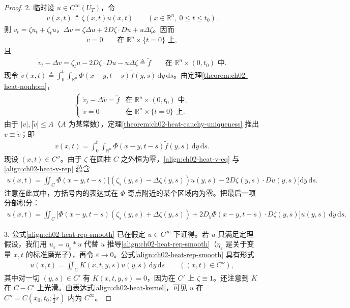 \documentclass[../../main.tex]{subfiles}
\begin{document}
\begin{proof}
2. 临时设 $u\in C^\infty(U_T)$，令
\begin{align*}
v(x,t)\triangleq\zeta(x,t)u(x,t) \qquad (x\in\mathbb{R}^n,\ 0\leqslant t\leqslant t_0).
\end{align*}
则 $v_t=\zeta u_t+\zeta_t u$，$\Delta v=\zeta\Delta u+2D\zeta\cdot Du+u\Delta\zeta$。因而
\begin{align}\label{align:ch02-heat-v0-bis}
v=0 \qquad \text{在 }\mathbb{R}^n\times\{t=0\}\text{ 上},
\end{align}
且
\begin{align}\label{align:ch02-heat-v-eq}
v_t-\Delta v=\zeta_t u-2D\zeta\cdot Du-u\Delta\zeta\triangleq\widetilde{f} \qquad \text{在 }\mathbb{R}^n\times(0,t_0)\text{ 中}.
\end{align}
现令 $\widetilde{v}(x,t)\triangleq\int_0^t\int_{\mathbb{R}^n}\Phi(x-y,t-s)\widetilde{f}(y,s)\,\mathrm{d}y\,\mathrm{d}s$。由定理\cref{theorem:ch02-heat-nonhom}，
\begin{align}\label{align:ch02-heat-vtilde}
\begin{cases}
\widetilde{v}_t-\Delta\widetilde{v}=\widetilde{f} & \text{在 }\mathbb{R}^n\times(0,t_0)\text{ 中},\\
\widetilde{v}=0 & \text{在 }\mathbb{R}^n\times\{t=0\}\text{ 上}.
\end{cases}
\end{align}
由于 $|v|,|\widetilde{v}|\leqslant A$（$A$ 为某常数），定理\cref{theorem:ch02-heat-cauchy-uniqueness} 推出 $v\equiv\widetilde{v}$；即
\begin{align}\label{align:ch02-heat-v-rep}
v(x,t)=\int_0^t\int_{\mathbb{R}^n}\Phi(x-y,t-s)\widetilde{f}(y,s)\,\mathrm{d}y\,\mathrm{d}s.
\end{align}
现设 $(x,t)\in C''$。由于 $\zeta$ 在圆柱 $C$ 之外恒为零，\eqref{align:ch02-heat-v-eq} 与\eqref{align:ch02-heat-v-rep} 蕴含
\begin{align*}
u(x,t)=\iint_C\Phi(x-y,t-s)\big[(\zeta_s(y,s)-\Delta\zeta(y,s))u(y,s)-2D\zeta(y,s)\cdot Du(y,s)\big]\mathrm{d}y\,\mathrm{d}s.
\end{align*}
注意在此式中，方括号内的表达式在 $\Phi$ 奇点附近的某个区域内为零。把最后一项分部积分：
\begin{align}\label{align:ch02-heat-rep-smooth}
u(x,t)=\iint_C\Big[\Phi(x-y,t-s)(\zeta_s(y,s)+\Delta\zeta(y,s))
+2D_y\Phi(x-y,t-s)\cdot D\zeta(y,s)\Big]u(y,s)\,\mathrm{d}y\,\mathrm{d}s.
\end{align}

3. 公式\eqref{align:ch02-heat-rep-smooth} 已在假定 $u\in C^\infty$ 下证得。若 $u$ 只满足定理假设，我们用 $u_\varepsilon=\eta_\varepsilon*u$ 代替 $u$ 推导\eqref{align:ch02-heat-rep-smooth}（$\eta_\varepsilon$ 是关于变量 $x,t$ 的标准磨光子），再令 $\varepsilon\to 0$。公式\eqref{align:ch02-heat-rep-smooth} 具有形式
\begin{align}\label{align:ch02-heat-kernel}
u(x,t)=\iint_C K(x,t,y,s)u(y,s)\,\mathrm{d}y\,\mathrm{d}s \qquad ((x,t)\in C''),
\end{align}
其中对一切 $(y,s)\in C'$ 有 $K(x,t,y,s)=0$，因为在 $C'$ 上 $\zeta\equiv 1$。还注意到 $K$ 在 $C-C'$ 上光滑。由表达式\eqref{align:ch02-heat-kernel}，可见 $u$ 在 $C''=C(x_0,t_0;\frac{1}{2}r)$ 内为 $C^\infty$。
\end{proof}
\end{document}
